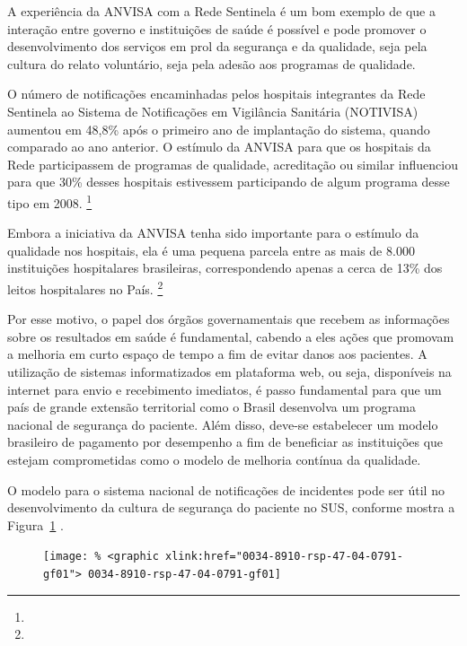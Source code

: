 \documentclass{article}
\begin{document}

A experiência da ANVISA com a Rede Sentinela é um bom exemplo de que a interação entre
        governo e instituições de saúde é possível e pode promover o desenvolvimento dos serviços em
        prol da segurança e da qualidade, seja pela cultura do relato voluntário, seja pela adesão
        aos programas de qualidade.

O número de notificações encaminhadas pelos hospitais integrantes da Rede Sentinela ao
        Sistema de Notificações em Vigilância Sanitária (NOTIVISA) aumentou em 48,8\% após o primeiro
        ano de implantação do sistema, quando comparado ao ano anterior. O estímulo da ANVISA para
        que os hospitais da Rede participassem de programas de qualidade, acreditação ou similar
        influenciou para que 30\% desses hospitais estivessem participando de algum programa desse
        tipo em 2008. %
\footnote{}  


Embora a iniciativa da ANVISA tenha sido importante para o estímulo da qualidade nos
        hospitais, ela é uma pequena parcela entre as mais de 8.000 instituições hospitalares
        brasileiras, correspondendo apenas a cerca de 13\% dos leitos hospitalares no País. %
\footnote{}  


Por esse motivo, o papel dos órgãos governamentais que recebem as informações sobre os
        resultados em saúde é fundamental, cabendo a eles ações que promovam a melhoria em curto
        espaço de tempo a fim de evitar danos aos pacientes. A utilização de sistemas informatizados
        em plataforma web, ou seja, disponíveis na internet para envio e recebimento imediatos, é
        passo fundamental para que um país de grande extensão territorial como o Brasil desenvolva
        um programa nacional de segurança do paciente. Além disso, deve-se estabelecer um modelo
        brasileiro de pagamento por desempenho a fim de beneficiar as instituições que estejam
        comprometidas como o modelo de melhoria contínua da qualidade.

O modelo para o sistema nacional de notificações de incidentes pode ser útil no
        desenvolvimento da cultura de segurança do paciente no SUS, conforme mostra a %
Figura~\ref{fig:f01}
 .

\begin{figure}
\texttt{[image: \% <graphic xlink:href="0034-8910-rsp-47-04-0791-gf01">
0034-8910-rsp-47-04-0791-gf01]}
\caption{}\label{fig:f01}
\end{figure}
\end{document}
